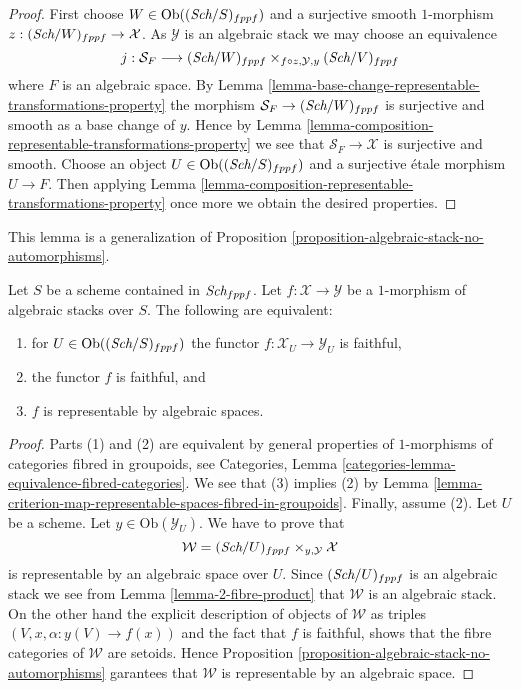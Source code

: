 \begin{proof}
First choose $W \in \text{Ob}((\textit{Sch}/S)_{fppf})$ and a surjective
smooth $1$-morphism $z : (\textit{Sch}/W)_{fppf} \to \mathcal{X}$.
As $\mathcal{Y}$ is an algebraic stack we may choose an equivalence
$$
j :
\mathcal{S}_F
\longrightarrow
(\textit{Sch}/W)_{fppf}
\times_{f \circ z, \mathcal{Y}, y}
(\textit{Sch}/V)_{fppf}
$$
where $F$ is an algebraic space. By
Lemma \ref{lemma-base-change-representable-transformations-property}
the morphism
$\mathcal{S}_F \to (\textit{Sch}/W)_{fppf}$ is surjective and smooth
as a base change of $y$. Hence by
Lemma \ref{lemma-composition-representable-transformations-property}
we see that $\mathcal{S}_F \to \mathcal{X}$ is surjective and smooth.
Choose an object $U \in \text{Ob}((\textit{Sch}/S)_{fppf})$
and a surjective \'etale morphism $U \to F$. Then applying
Lemma \ref{lemma-composition-representable-transformations-property}
once more we obtain the desired properties.
\end{proof}

\noindent
This lemma is a generalization of
Proposition \ref{proposition-algebraic-stack-no-automorphisms}.

\begin{lemma}
\label{lemma-characterize-representable-by-algebraic-spaces}
Let $S$ be a scheme contained in $\textit{Sch}_{fppf}$.
Let $f : \mathcal{X} \to \mathcal{Y}$ be a $1$-morphism of algebraic
stacks over $S$. The following are equivalent:
\begin{enumerate}
\item for $U \in \text{Ob}((\textit{Sch}/S)_{fppf})$
the functor $f : \mathcal{X}_U \to \mathcal{Y}_U$ is faithful,
\item the functor $f$ is faithful, and
\item $f$ is representable by algebraic spaces.
\end{enumerate}
\end{lemma}

\begin{proof}
Parts (1) and (2) are equivalent by general properties of $1$-morphisms
of categories fibred in groupoids, see
Categories, Lemma \ref{categories-lemma-equivalence-fibred-categories}.
We see that (3) implies (2) by
Lemma \ref{lemma-criterion-map-representable-spaces-fibred-in-groupoids}.
Finally, assume (2).
Let $U$ be a scheme. Let $y \in \text{Ob}(\mathcal{Y}_U)$.
We have to prove that
$$
\mathcal{W} = (\textit{Sch}/U)_{fppf} \times_{y, \mathcal{Y}} \mathcal{X}
$$
is representable by an algebraic space over $U$. Since
$(\textit{Sch}/U)_{fppf}$ is an algebraic stack we see from
Lemma \ref{lemma-2-fibre-product}
that $\mathcal{W}$ is an algebraic stack.
On the other hand the explicit description of objects of $\mathcal{W}$
as triples $(V, x, \alpha : y(V) \to f(x))$ and the fact that $f$ is
faithful, shows that the fibre categories of $\mathcal{W}$ are setoids. Hence
Proposition \ref{proposition-algebraic-stack-no-automorphisms}
garantees that $\mathcal{W}$ is representable by an algebraic space.
\end{proof}

